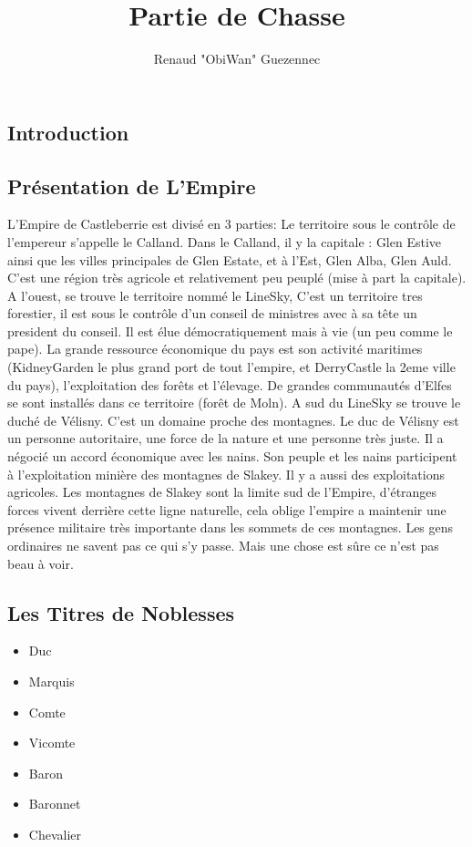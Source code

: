 \documentclass[oneside,12pt]{book}
\title{Partie de Chasse}
\author{Renaud "ObiWan" Guezennec}
\date{}
\begin{document}
\maketitle \clearpage
\tableofcontents \clearpage

\begin{flushleft}
    \chapter{Introduction}
        \section{Présentation de L'Empire}
        L'Empire de Castleberrie est divisé en 3 parties: Le territoire sous le contrôle de l'empereur s'appelle le Calland. Dans le Calland, il y la capitale : Glen Estive ainsi que les villes principales de Glen Estate, et à l'Est, Glen Alba, Glen Auld. C'est une région très agricole et relativement peu peuplé (mise à part la capitale). A l'ouest, se trouve le territoire nommé le LineSky, C'est un territoire tres forestier, il est sous le contrôle d'un conseil de ministres avec à sa tête un president du conseil. Il est élue démocratiquement mais à vie (un peu comme le pape). La grande ressource économique du pays est son activité maritimes (KidneyGarden le plus grand port de tout l'empire, et DerryCastle la 2eme ville du pays), l'exploitation des forêts et l'élevage. De grandes communautés d'Elfes se sont installés dans ce territoire (forêt de Moln). A sud du LineSky se trouve le duché de Vélisny. C'est un domaine proche des montagnes. Le duc de Vélisny est un personne autoritaire, une force de la nature et une personne très juste. Il a négocié un accord économique avec les nains. Son peuple et les nains participent à l'exploitation minière des montagnes de Slakey. Il y a aussi des exploitations agricoles. 
       Les montagnes de Slakey sont la limite sud de l'Empire, d'étranges forces vivent derrière cette ligne naturelle, cela oblige l'empire a maintenir une présence militaire très importante dans les sommets de ces montagnes. Les gens ordinaires ne savent pas ce qui s'y passe. Mais une chose est sûre ce n'est pas beau à voir. 
        
         
         
     \section{Les Titres de Noblesses}
\begin{itemize}
\item Duc
\item Marquis
\item Comte
\item Vicomte
\item Baron
\item Baronnet
\item Chevalier
\end{itemize}


\end{flushleft}
\end{document}
